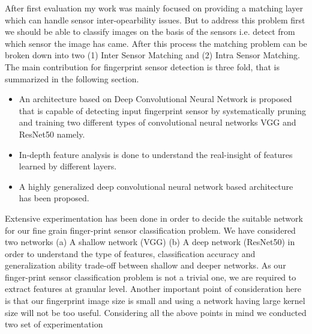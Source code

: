 \documentclass[12pt, a4paper,twoside]{article}
\begin{document}
\label{sec:workAfter}

	After first evaluation my work was mainly focused on providing a matching layer which can handle sensor inter-opearbility issues. But to address this problem first we should be able to classify images on the basis of the sensors i.e. detect from which sensor the image has came. After this process the matching problem can be broken down into two (1) Inter Sensor Matching and (2) Intra Sensor Matching. The main contribution for fingerprint sensor detection is three fold, that is summarized in the following section.
	
	\begin{itemize}
		\item  An architecture based on Deep Convolutional Neural Network is proposed that is capable of detecting input fingerprint sensor by systematically pruning and training two different types of convolutional neural networks VGG and ResNet50 namely.
		\item In-depth feature analysis is done to understand the real-insight of features learned by different layers.
		\item A highly generalized deep convolutional neural network based architecture has been proposed.
	\end{itemize}

	Extensive experimentation has been done in order to decide the suitable network for our fine grain finger-print sensor classification problem. We have considered two networks (a) A shallow network (VGG) (b) A deep network (ResNet50) in order to understand the type of features, classification accuracy and generalization ability trade-off between shallow and deeper networks. As our finger-print sensor classification problem is not a trivial one, we are required to extract features at granular level. Another important point of consideration here is that our fingerprint image size is small and using a network having large kernel size will not be too useful. Considering all the above points in mind we conducted two set of experimentation
\end{document}
